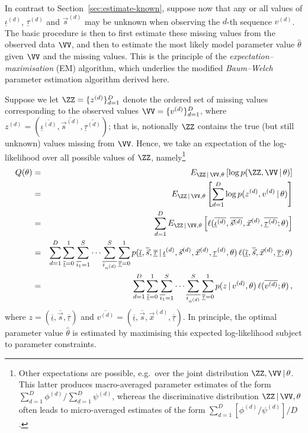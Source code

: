 \documentclass[a4paper]{article}
\newcommand{\ui}{\underline{\iota}}
\newcommand{\ut}{\underline{\tau}}
\begin{document}
In contrast to Section~\ref{sec:estimate-known}, suppose now that any or all values of $\ui^{(d)}$, $\ut^{(d)}$ and $\vec{s}^{(d)}$ may be unknown
when observing the $d$-th sequence $v^{(d)}$. The basic procedure is then to first estimate these missing values from the observed data $\VV$, and then to estimate the 
most likely model parameter value $\hat{\theta}$ given $\VV$ and the missing values. This is the principle of the {\em expectation--maximisation} (EM) algorithm, which underlies the
modified {\em Baum--Welch} parameter estimation algorithm derived here.

Suppose we let $\ZZ=\{z^{(d)}\}_{d=1}^{D}$ denote the ordered set of missing values
corresponding to the observed values $\VV=\{v^{(d)}\}_{d=1}^{D}$, where $z^{(d)}=(\overline{\ui^{(d)}},\overline{\vec{s}^{(d)}},\overline{\ut^{(d)}})$;
that is, notionally $\ZZ$ contains the true (but still unknown) values missing from $\VV$.
Hence, we take an expectation of the log-likelihood over all possible values of
$\ZZ$, namely\footnote{Other expectations are possible, e.g.\ over the joint distribution $\ZZ,\VV\,|\,\theta$. This latter produces macro-averaged
parameter estimates of the form $\sum_{d=1}^D\phi^{(d)}/\sum_{d=1}^D\psi^{(d)}$, whereas the discriminative distribution $\ZZ\,|\,\VV,\theta$
often leads to micro-averaged estimates of the form $\sum_{d=1}^D[\phi^{(d)}/\psi^{(d)}]/D$.}
\begin{eqnarray}
  Q(\theta) & = & E_{\ZZ\,|\,\VV,\theta}\left[\log p(\ZZ,\VV\,|\,\theta)\right]
\nonumber\\& = & 
E_{\ZZ\,|\,\VV,\theta}\left[\sum_{d=1}^D \log p(z^{(d)},v^{(d)}\,|\,\theta)\right]
\nonumber\\& = & 
\sum_{d=1}^D E_{\ZZ\,|\,\VV,\theta}\left[
\ell(\overline{\ui^{(d)}},\overline{\vec{s}^{(d)}},\vec{x}^{(d)},\overline{\ut^{(d)}};\theta)
\right]
\nonumber\\& = & 
\sum_{d=1}^D \sum_{\overline{\ui}=0}^{1}\sum_{\overline{i_1}=1}^{S}\cdots\sum_{\overline{i_{n^{(d)}}}}^{S}
\sum_{\overline{\ut}=0}^{1}
p(\overline{\ui},\overline{\vec{s}},\overline{\ut}\,|\,\ui^{(d)},\vec{s}^{(d)},\vec{x}^{(d)},\ut^{(d)},\theta) 
\,\ell(\overline{\ui},\overline{\vec{s}},\vec{x}^{(d)},\overline{\ut};\theta)
\nonumber\\& = &
\sum_{d=1}^D \sum_{\overline{\ui}=0}^{1}\sum_{\overline{i_1}=1}^{S}\cdots\sum_{\overline{i_{n^{(d)}}}}^{S}
\sum_{\overline{\ut}=0}^{1}
p(z\,|\,v^{(d)},\theta) \,\ell(\overline{v^{(d)}};\theta)
\,,
\end{eqnarray}
where $z=(\overline{\ui},\overline{\vec{s}},\overline{\ut})$ and 
$\overline{v^{(d)}}=(\overline{\ui},\overline{\vec{s}},\vec{x}^{(d)},\overline{\ut})$.
In principle, the optimal parameter value $\hat{\theta}$ is estimated by maximising this expected log-likelihood subject to parameter constraints.
\end{document}
